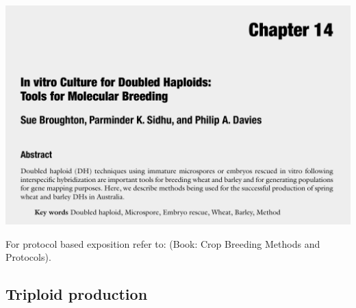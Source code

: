 \documentclass[
  ignorenonframetext,
  aspectratio=169]{beamer}
\begin{document}
\begin{frame}{}
\begin{center}\includegraphics[width=0.6\linewidth]{../images/protocol_double_haploid_production} \end{center}

For protocol based exposition refer to: \citet{broughton2014vitro}
(Book: Crop Breeding Methods and Protocols).
\end{frame}

\hypertarget{triploid-production}{%
\subsection{Triploid production}\label{triploid-production}}
\end{document}
